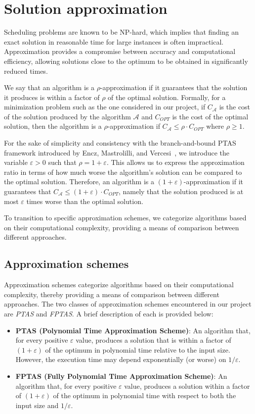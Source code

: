 \section{Solution approximation}
Scheduling problems are known to be NP-hard, which implies that finding an exact solution in reasonable time for large instances is often impractical.
Approximation provides a compromise between accuracy and computational efficiency, allowing solutions close to the optimum to be obtained in significantly reduced times.

We say that an algorithm is a $\rho$-approximation if it guarantees that the solution it produces is within a factor of $\rho$ of the optimal solution.
Formally, for a minimization problem such as the one considered in our project, if $C_{\mathcal{A}}$ is the cost of the solution produced by the algorithm $\mathcal{A}$ and $C_{OPT}$ is the cost of the optimal solution, then the algorithm is a $\rho$-approximation if $C_{\mathcal{A}} \leq \rho \cdot C_{OPT}$ where $\rho \geq 1$.

For the sake of simplicity and consistency with the branch-and-bound PTAS framework introduced by Encz, Mastrolilli, and Vercesi~\cite{bb-ptas}, we introduce the variable $\varepsilon > 0$ such that $\rho = 1 + \varepsilon$.
This allows us to express the approximation ratio in terms of how much worse the algorithm's solution can be compared to the optimal solution.
Therefore, an algorithm is a $(1 + \varepsilon)$-approximation if it guarantees that $C_{\mathcal{A}} \leq (1 + \varepsilon) \cdot C_{OPT}$, namely that the solution produced is at most $\varepsilon$ times worse than the optimal solution.

To transition to specific approximation schemes, we categorize algorithms based on their computational complexity, providing a means of comparison between different approaches.

\subsection{Approximation schemes}
Approximation schemes categorize algorithms based on their computational complexity, thereby providing a means of comparison between different approaches.
The two classes of approximation schemes encountered in our project are \emph{PTAS} and \emph{FPTAS}.
A brief description of each is provided below:
\begin{itemize}
  \item \textbf{PTAS (Polynomial Time Approximation Scheme)}: An algorithm that, for every positive $\varepsilon$ value, produces a solution that is within a factor of $(1 + \varepsilon)$ of the optimum in polynomial time relative to the input size.
  However, the execution time may depend exponentially (or worse) on $1/\varepsilon$.
  \item \textbf{FPTAS (Fully Polynomial Time Approximation Scheme)}: An algorithm that, for every positive $\varepsilon$ value, produces a solution within a factor of $(1 + \varepsilon)$ of the optimum in polynomial time with respect to both the input size and $1/\varepsilon$.
\end{itemize}

